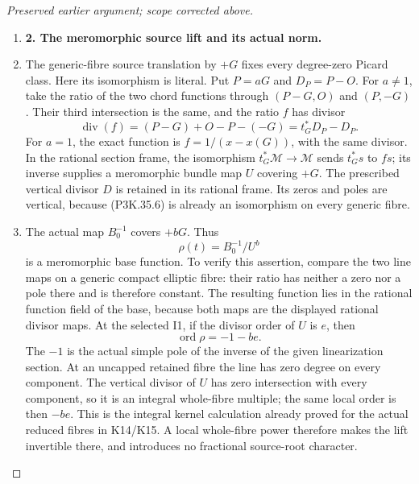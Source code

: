 \begin{proof}[Preserved earlier argument; scope corrected above]
\begin{enumerate}[label=\arabic*.]
\item \par\medskip\noindent\textbf{2. The meromorphic source lift and its actual norm.}\enspace

\item The generic-fibre source translation by \(+G\) fixes every degree-zero
Picard class. Here its isomorphism is literal. Put \(P=aG\) and
\(D_P=P-O\). For \(a\ne1\), take the ratio of the two chord functions
through \((P-G,O)\) and \((P,-G)\). Their third intersection is the
same, and the ratio \(f\) has divisor
\[
             \operatorname{div}(f)
                 =(P-G)+O-P-(-G)=t_G^*D_P-D_P.         \tag{P3K.35.6}
\]
For \(a=1\), the exact function is \(f=1/(x-x(G))\), with the
same divisor. In the rational section frame, the isomorphism
\(t_G^*\mathcal M\to\mathcal M\) sends \(t_G^*s\) to \(fs\);
its inverse supplies a meromorphic bundle map \(U\) covering \(+G\).
The prescribed vertical divisor \(D\) is retained in its rational
frame. Its zeros and poles are vertical, because (P3K.35.6) is already
an isomorphism on every generic fibre.

\item The actual map \(B_0^{-1}\) covers \(+bG\). Thus
\[
                        \rho(t)=B_0^{-1}/U^b            \tag{P3K.35.7}
\]
is a meromorphic base function. To verify this assertion, compare the
two line maps on a generic compact elliptic fibre: their ratio has
neither a zero nor a pole there and is therefore constant. The resulting
function lies in the rational function field of the base, because both
maps are the displayed rational divisor maps. At the selected I1, if
the divisor order of \(U\) is \(e\), then
\[
                      \operatorname{ord}\rho=-1-be.     \tag{P3K.35.8}
\]
The \(-1\) is the actual simple pole of the inverse of the given
linearization section. At an uncapped retained fibre the line has zero
degree on every component. The vertical divisor of \(U\) has zero
intersection with every component, so it is an integral whole-fibre
multiple; the same local order is then \(-be\). This is the integral
kernel calculation already proved for the actual reduced fibres in
K14/K15. A local whole-fibre power therefore makes the lift invertible
there, and introduces no fractional source-root character.


\end{enumerate}
\end{proof}
